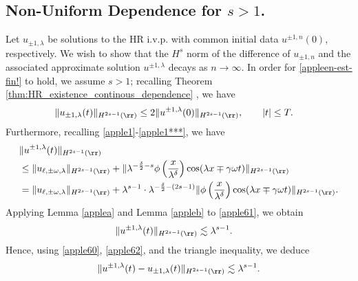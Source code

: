 \subsection{Non-Uniform Dependence for $s > 1$.}
Let $u_{\pm 1,\lambda}$ be solutions to the HR i.v.p. with common initial data $u^{\pm 1,
n}(0)$, respectively.
We wish to show that the $H^s$ norm of the difference of $u_{\pm 1,
n}$ and the associated approximate solution $u^{\pm 1,\lambda}$
decays as $n \to \infty$. In order for \eqref{appleen-est-fin!} to hold,
we assume $s > 1$; recalling Theorem \ref{thm:HR_existence_continous_dependence}
, we
have
\begin{equation}
	\begin{split}
		\|u_{\pm 1,\lambda} (t) \|_{H^{2s-1}(\rr)}
		& \le 2 \|u^{\pm 1,\lambda}(0) \|_{H^{2s-1}(\rr)}, \qquad
		|t| \le T.
		\label{apple60}
	\end{split}
\end{equation}
Furthermore, recalling \eqref{apple1}-\eqref{apple1***}, we have 
\begin{equation}
	\begin{split}
		& \|u^{\pm 1, \lambda}(t)\|_{H^{2s-1}(\rr)}
		\\
		& \le \|u_{\ell, \pm \omega, \lambda}\|_{H^{2s-1}(\rr)} +
		 \| \lambda^{-\frac{\delta}{2} -s} \phi \left(
		\frac{x}{\lambda^\delta} \right) \cos(\lambda x \mp \gamma \omega t)
		\|_{H^{2s-1}(\rr)}
		\\
		& = \|u_{\ell, \pm \omega, \lambda}\|_{H^{2s-1}(\rr)}
		+
		\lambda^{s-1} \cdot
		\lambda^{-\frac{\delta}{2}-(2s-1)} \|\phi \left(
		\frac{x}{\lambda^\delta} \right) \cos(\lambda x \mp \gamma \omega t)
		\|_{H^{2s-1}(\rr)}.
		\label{apple61}
	\end{split}
\end{equation}
Applying Lemma \ref{applea} and Lemma \ref{appleb} to \eqref{apple61}, we obtain
\begin{equation}
	\begin{split}
		\|u^{\pm 1, \lambda}(t) \|_{H^{2s-1}(\rr)}
		& \lesssim \lambda^{s-1}.
		\label{apple62}
	\end{split}
\end{equation}
Hence, using \eqref{apple60}, \eqref{apple62}, and the triangle inequality, we deduce
\begin{equation}
	\begin{split}
		\|u^{\pm 1, \lambda}(t) - u_{\pm 1, \lambda}(t) \|_{H^{2s-1}(\rr)}
		\lesssim \lambda^{s-1}.
		\label{apple63}
	\end{split}
\end{equation}
